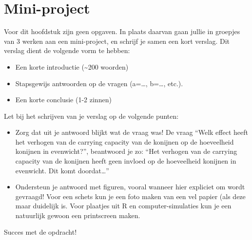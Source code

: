 \documentclass[
  a4paper,
]{scrbook}
\providecommand{\tightlist}{%
  \setlength{\itemsep}{0pt}\setlength{\parskip}{0pt}}\usepackage{longtable,booktabs,array}
\theoremstyle{definition}
\theoremstyle{remark}
\begin{document}
\hypertarget{mini-project}{%
\section{Mini-project}\label{mini-project}}

Voor dit hoofdstuk zijn geen opgaven. In plaats daarvan gaan jullie in
groepjes van 3 werken aan een mini-project, en schrijf je samen een kort
verslag. Dit verslag dient de volgende vorm te hebben:

\begin{itemize}
\tightlist
\item
  Een korte introductie (\textasciitilde200 woorden)
\item
  Stapsgewijs antwoorden op de vragen (a=\ldots, b=\ldots, etc.).
\item
  Een korte conclusie (1-2 zinnen)
\end{itemize}

Let bij het schrijven van je verslag op de volgende punten:

\begin{itemize}
\tightlist
\item
  Zorg dat uit je antwoord blijkt wat de vraag was! De vraag ``Welk
  effect heeft het verhogen van de carrying capacity van de konijnen op
  de hoeveelheid konijnen in evenwicht?'', beantwoord je zo: ``Het
  verhogen van de carrying capacity van de konijnen heeft geen invloed
  op de hoeveelheid konijnen in evenwicht. Dit komt doordat\ldots{}''
\item
  Ondersteun je antwoord met figuren, vooral wanneer hier expliciet om
  wordt gevraagd! Voor een schets kun je een foto maken van een vel
  papier (als deze maar duidelijk is. Voor plaatjes uit R en
  computer-simulaties kun je een natuurlijk gewoon een printscreen
  maken.
\end{itemize}

Succes met de opdracht!
\end{document}
